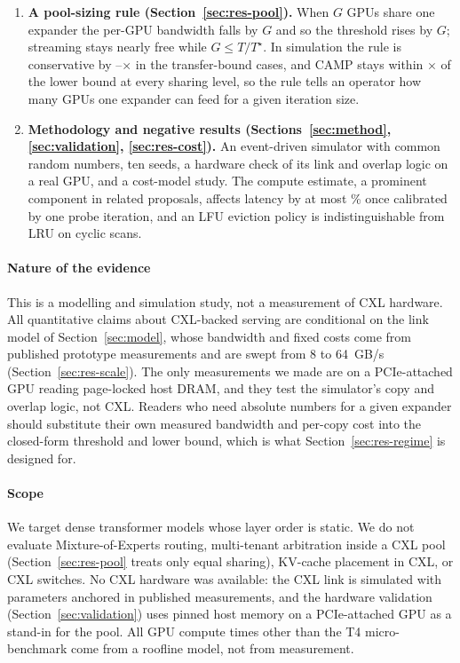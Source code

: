 \documentclass[preprint,12pt]{elsarticle}
\newcommand{\camp}{\textsc{CAMP}}
\begin{document}
\begin{enumerate}
\item \textbf{A pool-sizing rule (Section~\ref{sec:res-pool}).} When $G$ GPUs share one expander the per-GPU bandwidth falls by $G$ and so the threshold rises by $G$; streaming stays nearly free while $G\le T/T^\star$. In simulation the rule is conservative by \nPoolPredRatioMin--\nPoolPredRatioMax$\times$ in the transfer-bound cases, and \camp{} stays within \nPoolOverLbMax$\times$ of the lower bound at every sharing level, so the rule tells an operator how many GPUs one expander can feed for a given iteration size.
\item \textbf{Methodology and negative results (Sections~\ref{sec:method}, \ref{sec:validation}, \ref{sec:res-cost}).} An event-driven simulator with common random numbers, ten seeds, a hardware check of its link and overlap logic on a real GPU, and a cost-model study. The compute estimate, a prominent component in related proposals, affects latency by at most \nCmSpreadB\% once calibrated by one probe iteration, and an LFU eviction policy is indistinguishable from LRU on cyclic scans.
\end{enumerate}

\paragraph{Nature of the evidence} This is a modelling and simulation study, not a measurement of CXL hardware. All quantitative claims about CXL-backed serving are conditional on the link model of Section~\ref{sec:model}, whose bandwidth and fixed costs come from published prototype measurements and are swept from 8 to 64~GB/s (Section~\ref{sec:res-scale}). The only measurements we made are on a PCIe-attached GPU reading page-locked host DRAM, and they test the simulator's copy and overlap logic, not CXL. Readers who need absolute numbers for a given expander should substitute their own measured bandwidth and per-copy cost into the closed-form threshold and lower bound, which is what Section~\ref{sec:res-regime} is designed for.

\paragraph{Scope} We target dense transformer models whose layer order is static. We do not evaluate Mixture-of-Experts routing, multi-tenant arbitration inside a CXL pool (Section~\ref{sec:res-pool} treats only equal sharing), KV-cache placement in CXL, or CXL switches. No CXL hardware was available: the CXL link is simulated with parameters anchored in published measurements, and the hardware validation (Section~\ref{sec:validation}) uses pinned host memory on a PCIe-attached GPU as a stand-in for the pool. All GPU compute times other than the T4 micro-benchmark come from a roofline model, not from measurement.
\end{document}
